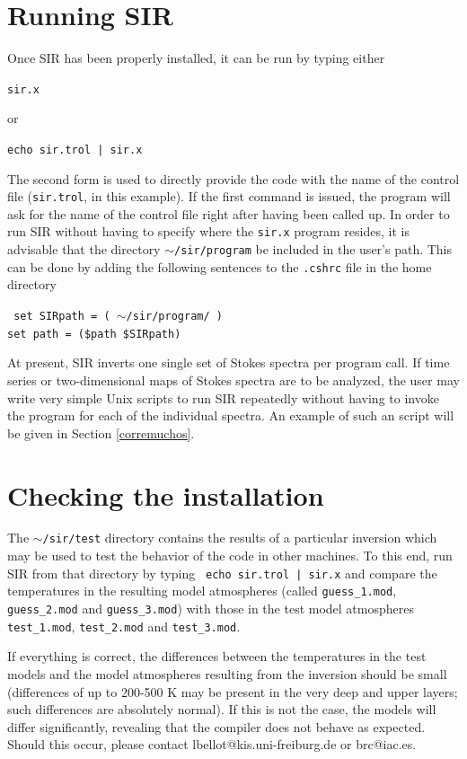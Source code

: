\section{Running SIR}
Once SIR has been properly installed, it can be run by typing either 
\begin{flushleft}
{\tt sir.x}
\end{flushleft}
 or 
\begin{flushleft}
{\tt echo sir.trol | sir.x} 
\end{flushleft} 
The second form is used to directly provide the code with the name of
the control file ({\tt sir.trol}, in this example). If the first
command is issued, the program will ask for the name of the control
file right after having been called up. In order to run SIR without
having to specify where the {\tt sir.x} program resides, it is
advisable that the directory {\tt $\sim$/sir/program} be included in the
user's path. This can be done by adding the following sentences to the
{\tt .cshrc} file in the home directory
\begin{flushleft}
\tt
set SIRpath    = ( $\sim$/sir/program/ ) \\
set path    = (\$path \$SIRpath)
\end{flushleft}

At present, SIR inverts one single set of Stokes spectra per program 
call. If time series or two-dimensional maps of Stokes spectra are to 
be analyzed, the user may write very simple Unix scripts to run SIR 
repeatedly without having to invoke the program for each of the 
individual spectra. An example of such an script will be given 
in Section \ref{corremuchos}.

\section{Checking the installation}
The {\tt $\sim$/sir/test} directory contains the results of a particular
inversion which may be used to test the behavior of the code in other
machines. To this end, run SIR from that directory by typing {\tt 
echo sir.trol | sir.x} and compare the temperatures in the resulting 
model atmospheres (called {\tt guess\_1.mod}, {\tt guess\_2.mod} and 
{\tt guess\_3.mod}) with those in the test model atmospheres 
{\tt test\_1.mod}, {\tt test\_2.mod} and {\tt test\_3.mod}. 

If everything is correct, the differences between the temperatures
in the test models and the model atmospheres resulting from the
inversion should be small (differences of up to 200-500 K may be
present in the very deep and upper layers; such differences are
absolutely normal). If this is not the case, the models will differ 
significantly, revealing that the compiler does not behave as 
expected. Should this occur, please contact 
lbellot@kis.uni-freiburg.de or brc@iac.es.  

